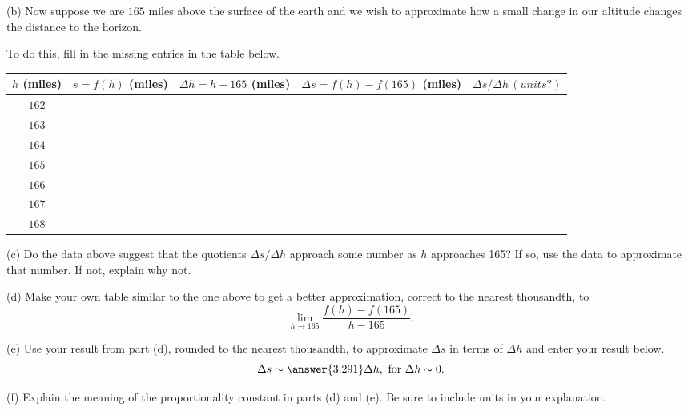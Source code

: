 \documentclass{ximera}
\begin{document}
\begin{question}
(b) Now suppose we are $165$ miles above the surface of the earth and we wish to approximate how a small change in our altitude changes the distance to the horizon.

To do this, fill in the missing entries in the table below.

\begin{center}
  \begin{tabular}{ | c| c | c | c | c |}
    \hline
    $h$ (miles) & $s = f(h)$ (miles) & $\Delta h = h-165$ (miles)  & $\Delta s =f(h) - f(165)$ (miles) & $\Delta s/\Delta h \, (units?)$ \\ \hline
     $162$ &  &  &   & \\ \hline
    $163$ &  &  &   & \\ \hline
    $164$ &  &  &   &  \\ \hline
    $165$  &  &  &  &   \\ \hline
    $166$ &  &  &   &  \\ \hline
    $167$ &  &  &   &  \\ \hline
    $168$ &  &  &   &  \\ \hline
    \hline
  \end{tabular}
\end{center}

(c) Do the data above suggest that the quotients $\Delta s / \Delta h$ approach some number as $h$ approaches 165? If so, use the data to approximate that number. If not, explain why not.

(d) Make your own table similar to the one above to get a better approximation, correct to the nearest thousandth, to
\[
   \lim_{h\to 165} \frac{f(h) - f(165)}{h-165} .
\]


(e) Use your result from part (d), rounded to the nearest thousandth, to approximate $\Delta s$ in terms of $\Delta h$ and enter your result below.
\[
  \Delta s \sim \answer{3.291} \Delta h , \text{ for } \Delta h \sim 0.
\] 

(f) Explain the meaning of the proportionality constant in parts (d) and (e). Be sure to include units in your explanation.


\end{question}
\end{document}
